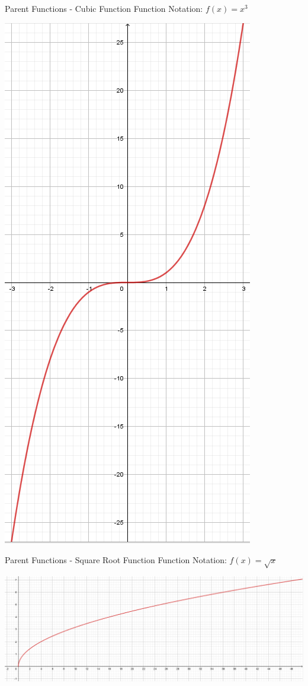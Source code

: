 \documentclass{beamer}
\begin{document}
\begin{frame}[t]{Parent Functions - Cubic Function}
Function Notation: $f(x) = x^3$

\includegraphics[scale=0.25]{Cubic.png}
\end{frame}

\begin{frame}[t]{Parent Functions - Square Root Function}
Function Notation: $f(x) = \sqrt{x}$

\includegraphics[width=\textwidth]{SQRT.png}
\end{frame}
\end{document}

